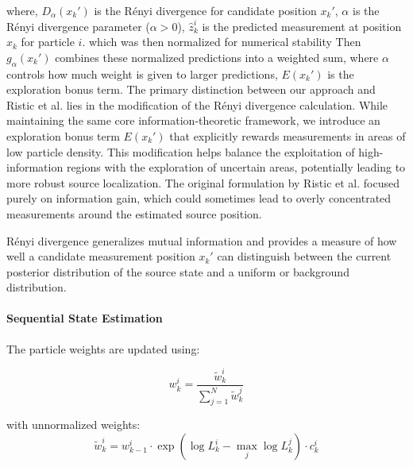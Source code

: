 \documentclass[../report.tex]{subfiles}
\begin{document}
    where, $D_\alpha(x_k')$ is the Rényi divergence for candidate position $x_k'$, $\alpha$ is the Rényi divergence parameter ($\alpha > 0$), $\hat{z}_k^i$ is the predicted measurement at position $x_k$ for particle $i$. which was then normalized for numerical stability Then $g_\alpha(x_k')$ combines these normalized predictions 
    into a weighted sum, where $\alpha$ controls how much weight is given to larger predictions, $E(x_k')$ is the exploration bonus term. The primary distinction between our approach and Ristic et al. 
    \cite{ristic2010information}
    lies in the modification of the Rényi divergence calculation. While maintaining the same core information-theoretic framework, we introduce an exploration bonus term $E(x_k')$ that explicitly 
    rewards measurements in areas of low particle density. This modification helps balance the exploitation of high-information regions with the exploration of uncertain areas, potentially leading 
    to more robust source localization. The original formulation by Ristic et al. focused purely on information gain, which could sometimes lead to overly concentrated measurements around the 
    estimated source position.

    Rényi divergence generalizes mutual information and provides a measure of how well a candidate measurement position $x_k'$ can distinguish between the current posterior distribution of the source state and a uniform or background distribution.

    \paragraph{Sequential State Estimation}
    The particle weights are updated using:

    \begin{equation}
    w_k^i = \frac{\tilde{w}_k^i}{\sum_{j=1}^N \tilde{w}_k^j}
    \end{equation}

    with unnormalized weights:
    \begin{equation}
    \tilde{w}_k^i = w_{k-1}^i \cdot \exp(\log L_k^i - \max_j \log L_k^j) \cdot c_k^i
    \end{equation}
\end{document}
